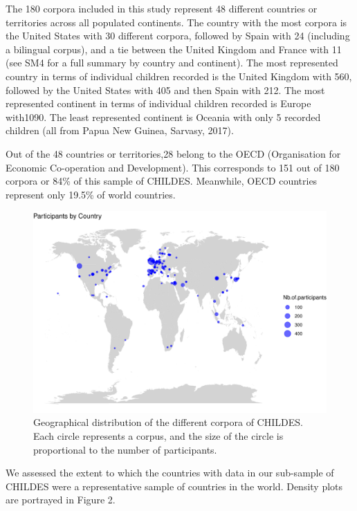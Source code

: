 \documentclass[
  man,floatsintext]{apa6}
\begin{document}
The 180 corpora included in this study represent 48 different countries or territories across all populated continents. The country with the most corpora is the United States with 30 different corpora, followed by Spain with 24 (including a bilingual corpus), and a tie between the United Kingdom and France with 11 (see SM4 for a full summary by country and continent). The most represented country in terms of individual children recorded is the United Kingdom with 560, followed by the United States with 405 and then Spain with 212. The most represented continent in terms of individual children recorded is Europe with1090. The least represented continent is Oceania with only 5 recorded children (all from Papua New Guinea, Sarvasy, 2017).

Out of the 48 countries or territories,28 belong to the OECD (Organisation for Economic Co-operation and Development). This corresponds to 151 out of 180 corpora or 84\% of this sample of CHILDES. Meanwhile, OECD countries represent only 19.5\% of world countries.

\begin{figure}
\centering
\includegraphics{CHILDES_short_files/figure-latex/unnamed-chunk-1-1.pdf}
\caption{\label{fig:unnamed-chunk-1}Geographical distribution of the different corpora of CHILDES. Each circle represents a corpus, and the size of the circle is proportional to the number of participants.}
\end{figure}

We assessed the extent to which the countries with data in our sub-sample of CHILDES were a representative sample of countries in the world. Density plots are portrayed in Figure 2.
\end{document}
